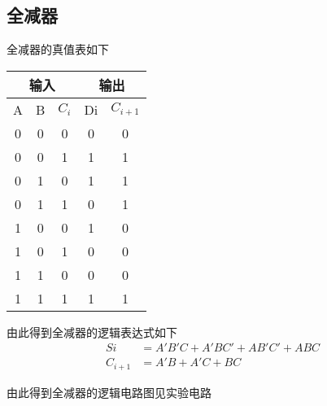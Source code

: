 \documentclass{article}
\begin{document}
\newpage

\subsection{全减器}
全减器的真值表如下
\begin{table}[h]
 \centering  
 \begin{tabular}{c|c|c|c|c}
     \hline
     \multicolumn{3}{c}{输入} \vline  &  \multicolumn{2}{c}{输出} \vline     \\ \hline
           A             & B    &$C_i $   &  Di               & $ C_{i+1} $  \\ \hline
           0             & 0    &0        &   0               & 0            \\ \hline
           0             & 0    &1        &   1               & 1            \\ \hline
           0             & 1    &0        &   1               & 1            \\ \hline
           0             & 1    &1        &   0               & 1            \\ \hline
           1             & 0    &0        &   1               & 0            \\ \hline
           1             & 0    &1        &   0               & 0            \\ \hline
           1             & 1    &0        &   0               & 0            \\ \hline
           1             & 1    &1        &   1               & 1            \\ \hline
         \end{tabular}
\end{table}
\par
由此得到全减器的逻辑表达式如下
\begin{align*}
\ Si&=A'B'C+A'BC'+AB'C'+ABC \\
\ C_{i+1}&=A'B+A'C+BC
\end{align*}
\par
由此得到全减器的逻辑电路图见实验电路
\newpage
\end{document}
